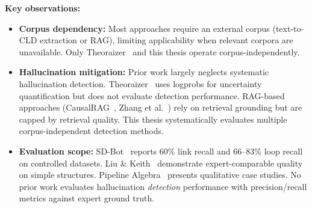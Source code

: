 \noindent\textbf{Key observations:}

\begin{itemize}[noitemsep]
    \item \textbf{Corpus dependency:} Most approaches require an external corpus (text-to-CLD extraction or RAG), limiting applicability when relevant corpora are unavailable. Only Theoraizer~\citep{Waaijers2024theoraizer} and this thesis operate corpus-independently.
    \item \textbf{Hallucination mitigation:} Prior work largely neglects systematic hallucination detection. Theoraizer~\citep{Waaijers2024theoraizer} uses logprobs for uncertainty quantification but does not evaluate detection performance. RAG-based approaches (CausalRAG~\citep{wang2025causalrag}, Zhang et al.~\citep{zhang2024causal}) rely on retrieval grounding but are capped by retrieval quality. This thesis systematically evaluates multiple corpus-independent detection methods.
    \item \textbf{Evaluation scope:} SD-Bot~\citep{hosseinichimeh2024textmapdynamicsbot} reports 60\% link recall and 66--83\% loop recall on controlled datasets. Liu \& Keith~\citep{liu2025leveraging} demonstrate expert-comparable quality on simple structures. Pipeline Algebra~\citep{reinholtz2025pipelinealgebra} presents qualitative case studies. No prior work evaluates hallucination \emph{detection} performance with precision/recall metrics against expert ground truth.
\end{itemize}
